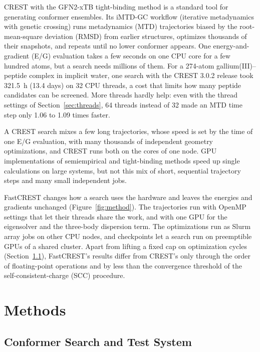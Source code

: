 \documentclass[journal=jctcce,manuscript=article]{achemso}
\begin{document}
CREST with the GFN2-xTB tight-binding method is a standard tool for generating conformer ensembles.\cite{crest2020,crest3,gfn2} Its iMTD-GC workflow (iterative metadynamics with genetic crossing)\cite{crest2020,grimme2019mtd} runs metadynamics (MTD)\cite{laio2002} trajectories biased by the root-mean-square deviation (RMSD) from earlier structures, optimizes thousands of their snapshots, and repeats until no lower conformer appears. One energy-and-gradient (E/G) evaluation takes a few seconds on one CPU core for a few hundred atoms, but a search needs millions of them. For a 274-atom gallium(III)--peptide complex in implicit water, one search with the CREST 3.0.2 release took 321.5~h (13.4 days) on 32 CPU threads, a cost that limits how many peptide candidates can be screened. More threads hardly help: even with the thread settings of Section~\ref{sec:threads}, 64 threads instead of 32 made an MTD time step only 1.06 to 1.09 times faster.

A CREST search mixes a few long trajectories, whose speed is set by the time of one E/G evaluation, with many thousands of independent geometry optimizations, and CREST runs both on the cores of one node. GPU implementations of semiempirical and tight-binding methods\cite{wu2012,maia2012,zhou2020,vuong2023,dxtb} speed up single calculations on large systems, but not this mix of short, sequential trajectory steps and many small independent jobs.

FastCREST changes how a search uses the hardware and leaves the energies and gradients unchanged (Figure~\ref{fig:method}). The trajectories run with OpenMP settings that let their threads share the work, and with one GPU for the eigensolver and the three-body dispersion term. The optimizations run as Slurm array jobs on other CPU nodes, and checkpoints let a search run on preemptible GPUs of a shared cluster. Apart from lifting a fixed cap on optimization cycles (Section~\ref{sec:search}), FastCREST's results differ from CREST's only through the order of floating-point operations and by less than the convergence threshold of the self-consistent-charge (SCC) procedure.

\section{Methods}
\label{sec:method}

\subsection{Conformer Search and Test System}
\label{sec:search}
\end{document}

